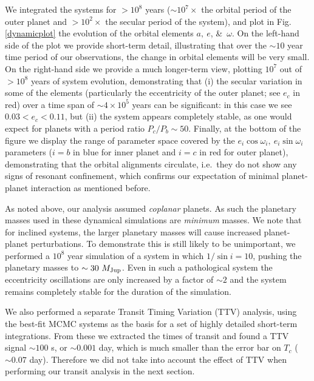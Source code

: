 We integrated the systems for $> 10^8$ years ($\sim 10^7\times$ the
orbital period of the outer planet and $> 10^2\times$ the secular
period of the system), and plot in Fig. \ref{dynamicplot} the
evolution of the orbital elements $a,\ e$, \&\ $\omega$. On the
left-hand side of the plot we provide short-term detail, illustrating
that over the $\sim 10$ year time period of our observations, the
change in orbital elements will be very small.  On the right-hand side
we provide a much longer-term view, plotting $10^7$ out of $>10^8$ years
of system evolution, demonstrating that (i) the secular variation in
some of the elements (particularly the eccentricity of the outer
planet; see $e_c$ in red) over a time span of $\sim 4 \times 10^5$
years can be significant: in this case we see $0.03 < e_c < 0.11$, but
(ii) the system appears completely stable, as one would expect for
planets with a period ratio $P_c / P_b \sim 50$.  Finally, at the
bottom of the figure we display the range of parameter space covered
by the $e_i\cos{\omega_i},\ e_i\sin{\omega_i}$ parameters ($i=b$ in
blue for inner planet and $i=c$ in red for outer planet),
demonstrating that the orbital alignments circulate, i.e.\ they do not
show any signs of resonant confinement, which confirms our expectation
of minimal planet-planet interaction as mentioned before.

As noted above, our analysis assumed \emph{coplanar} planets. As such
the planetary masses used in these dynamical simulations are
\emph{minimum} masses. We note that for inclined systems, the larger
planetary masses will cause increased planet-planet perturbations. To
demonstrate this is still likely to be unimportant, we performed a
$10^8$ year simulation of a system in which $1 / \sin{i} = 10 $,
pushing the planetary masses to $\sim 30\ \mjup$. Even in such a
pathological system the eccentricity oscillations are only increased
by a factor of $\sim 2$ and the system remains completely stable for
the duration of the simulation.

We also performed a separate Transit Timing Variation (TTV) analysis,
using the best-fit MCMC systems as the basis for a set of highly
detailed short-term integrations. From these we extracted the times of
transit and found a TTV signal $\sim 100$ s, or $\sim 0.001$ day,
which is much smaller than the error bar on $T_c$ ($\sim 0.07$
day). Therefore we did not take into account the effect of TTV when
performing our transit analysis in the next section.



